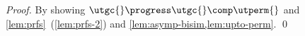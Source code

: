 \begin{proof}
  By showing $\utgc{}\progress\utgc{}\comp\utperm{}$ and
  \cref{lem:prfs}~(\ref{lem:prfs-2}) and \cref{lem:asymp-bisim,lem:upto-perm}. %
%
%  
%
%  
%  
%  
%
%  
%
%
%
%
\qed\end{proof}

